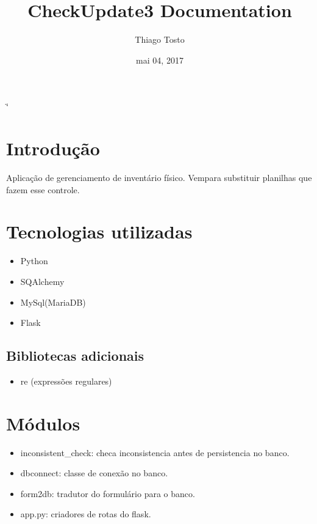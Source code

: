 \documentclass[letterpaper,10pt,openany,oneside,portuges]{sphinxmanual}
\title{CheckUpdate3 Documentation}
\date{mai 04, 2017}
\author{Thiago Tosto}
\begin{document}
\if\catcode`\"\active{}\fi
\maketitle
\sphinxtableofcontents
{}\label{\detokenize{index::doc}}



\chapter{Introdução}
\label{\detokenize{intro:introducao}}\label{\detokenize{intro:welcome-to-checkupdate3-s-documentation}}\label{\detokenize{intro::doc}}
Aplicação de gerenciamento de inventário físico. Vempara substituir planilhas que fazem esse controle.


\chapter{Tecnologias utilizadas}
\label{\detokenize{tecnologias::doc}}\label{\detokenize{tecnologias:tecnologias-utilizadas}}\begin{itemize}
\item {} 
Python

\item {} 
SQAlchemy

\item {} 
MySql(MariaDB)

\item {} 
Flask

\end{itemize}


\section{Bibliotecas adicionais}
\label{\detokenize{tecnologias:bibliotecas-adicionais}}\begin{itemize}
\item {} 
re (expressões regulares)

\end{itemize}


\chapter{Módulos}
\label{\detokenize{classes:modulos}}\label{\detokenize{classes::doc}}\begin{itemize}
\item {} 
inconsistent\_check: checa inconsistencia antes de persistencia no banco.

\item {} 
dbconnect: classe de conexão no banco.

\item {} 
form2db: tradutor do formulário para o banco.

\item {} 
app.py: criadores de rotas do flask.

\end{itemize}
\end{document}
